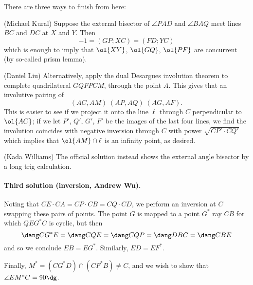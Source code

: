 \documentclass[11pt]{scrartcl}
\begin{document}
There are three ways to finish from here:
\begin{itemize}
  \ii (Michael Kural) Suppose the external bisector
  of $\angle PAD$ and $\angle BAQ$
  meet lines $BC$ and $DC$ at $X$ and $Y$.
  Then \[ -1 = (GP;XC) = (FD;YC) \]
  which is enough to imply that $\ol{XY}$, $\ol{GQ}$, $\ol{PF}$
  are concurrent (by so-called prism lemma).

  \ii (Daniel Liu) Alternatively,
  apply the dual Desargues involution theorem
  to complete quadrilateral $GQFPCM$, through the point $A$.
  This gives that an involutive pairing of
  \[ (AC,AM) \; (AP,AQ) \; (AG, AF). \]
  This is easier to see if we project it onto the
  line $\ell$ through $C$ perpendicular to $\ol{AC}$;
  if we let $P'$, $Q'$, $G'$, $F'$ be the images of the last four lines,
  we find the involution coincides with negative inversion through $C$
  with power $\sqrt{CP' \cdot CQ'}$
  which implies that $\ol{AM} \cap \ell$ is an infinity point, as desired.

  \ii (Kada Williams) The official solution instead shows the external angle
  bisector by a long trig calculation.
\end{itemize}

\paragraph{Third solution (inversion, Andrew Wu).}
Noting that $CE \cdot CA = CP \cdot CB = CQ \cdot CD$,
we perform an inversion at $C$ swapping these pairs of points.
The point $G$ is mapped to a point $G^\ast$ ray $CB$
for which $QEG^\ast C$ is cyclic, but then
\[ \dang CG^\ast E = \dang CQE = \dang CQP = \dang DBC = \dang CBE \]
and so we conclude $EB = EG^\ast$.
Similarly, $ED = EF^\ast$.

Finally, $M^\ast = (CG^\ast D) \cap (CF^\ast B) \neq C$,
and we wish to show that $\angle EM^\ast C = 90\dg$.
\end{document}
